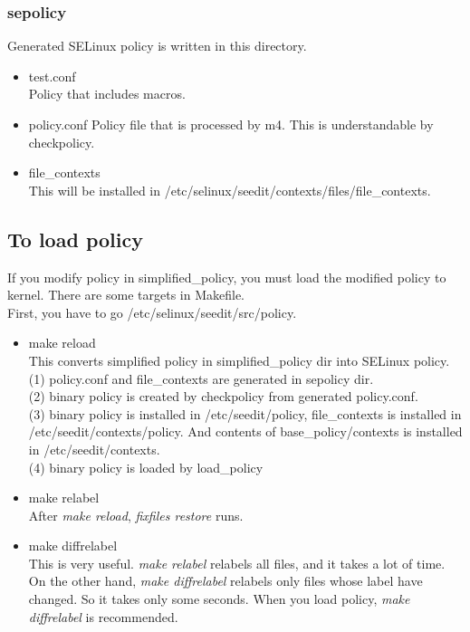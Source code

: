 \subsubsection{sepolicy}
 Generated SELinux policy is written in this directory. 
\begin{itemize}
 \item test.conf\\
 Policy that includes macros.
 \item policy.conf
 Policy file that is processed by m4. This is understandable by checkpolicy.
 \item file\_contexts\\
 This will be installed in /etc/selinux/seedit/contexts/files/file\_contexts.
\end{itemize}

\subsection{To load policy}\label{sec:loadpolicy}
 If you modify policy in simplified\_policy, you must load the modified
 policy to kernel. There are some targets in Makefile. \\
First, you have to go /etc/selinux/seedit/src/policy.
\begin{itemize}

\item make reload\\
 This converts simplified policy in simplified\_policy dir into SELinux policy.\\
(1) policy.conf and file\_contexts are generated in sepolicy dir. \\
(2) binary policy is created by checkpolicy from generated policy.conf.\\
(3) binary policy is installed in /etc/seedit/policy, file\_contexts is installed in /etc/seedit/contexts/policy. And contents of base\_policy/contexts is installed in /etc/seedit/contexts.\\
(4)  binary policy is loaded by load\_policy
\item make relabel\\
 After {\it make reload}, {\it fixfiles restore} runs.

\item make diffrelabel\\
 This is very useful. {\it make relabel} relabels all files, and it
      takes a lot of time. On the other hand, {\it make diffrelabel}
      relabels only files whose label have changed. So it takes only
      some seconds. When you load policy, {\it make diffrelabel} is recommended.
\end{itemize}

